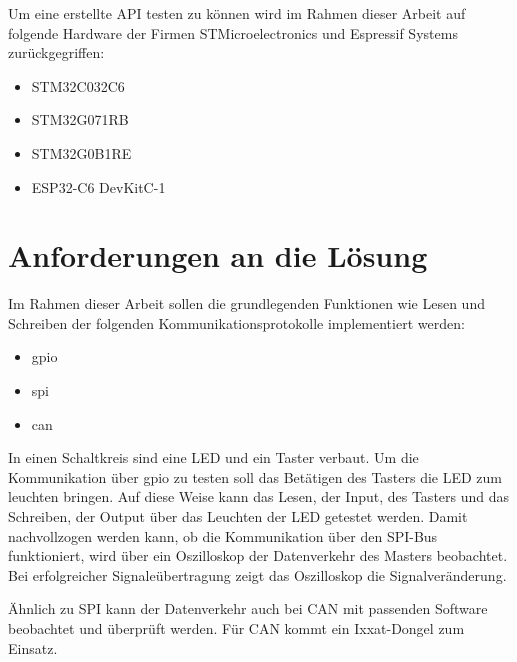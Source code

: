 Um eine erstellte API testen zu können wird im Rahmen dieser Arbeit auf folgende Hardware der Firmen STMicroelectronics und Espressif Systems zurückgegriffen:
\begin{itemize}
	\item STM32C032C6
	\item STM32G071RB
	\item STM32G0B1RE
	\item ESP32-C6 DevKitC-1
\end{itemize}


\section{Anforderungen an die Lösung}
Im Rahmen dieser Arbeit sollen die grundlegenden Funktionen wie Lesen und Schreiben der folgenden Kommunikationsprotokolle implementiert werden:
\begin{itemize}
	\item \gls{gpio}
	\item \gls{spi}
	\item \gls{can}
\end{itemize}

In einen Schaltkreis sind eine LED und ein Taster verbaut. 
Um die Kommunikation über \gls{gpio} zu testen soll das Betätigen des Tasters die LED zum leuchten bringen.
Auf diese Weise kann das Lesen, der Input, des Tasters und das Schreiben, der Output über das Leuchten der LED getestet werden.
Damit nachvollzogen werden kann, ob die Kommunikation über den SPI-Bus funktioniert, 
wird über ein Oszilloskop der Datenverkehr des Masters beobachtet. 
Bei erfolgreicher Signaleübertragung zeigt das Oszilloskop die Signalveränderung.

Ähnlich zu SPI kann der Datenverkehr auch bei CAN mit passenden Software beobachtet und überprüft werden.
Für CAN kommt ein Ixxat-Dongel zum Einsatz. %



























